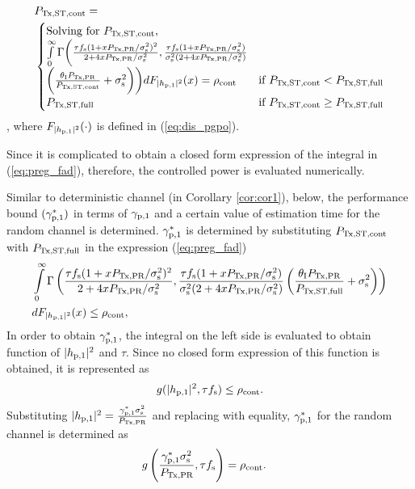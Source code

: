 {\begin{lemma}
\begin{align}
&P_{\text{Tx,ST,cont}} = \nonumber \\ 
& \begin{cases} 
\text{Solving for $P_{\text{Tx,ST,cont}}$, } \\ \int\limits_{0}^{\infty} \Gamma\bigg(\frac{\tau f_{\text{s}} (1 + x P_{\text{Tx,PR}}/\sigma^2_{\text{s}})^2}{2 + 4 x P_{\text{Tx,PR}}/\sigma^2_{\text{s}}}, \frac{\tau f_{\text{s}} (1 + x P_{\text{Tx,PR}}/\sigma^2_{\text{s}})}{\sigma^2_{\text{s}} (2 + 4 x P_{\text{Tx,PR}}/\sigma^2_{\text{s}})} \\ \bigg(\frac{\theta_{\text{I}}P_{\text{Tx,PR}}}{P_{\text{Tx,ST,cont}}}  +  \sigma^2_{\text{s}} \bigg)\bigg) d F_{|h_{\text{p,1}}|^2}(x) = \rho_{\text{cont}} & \mbox{if } P_{\text{Tx,ST,cont}} < P_{\text{Tx,ST,full}} \\
P_{\text{Tx,ST,full}} & \mbox{if } P_{\text{Tx,ST,cont}} \ge P_{\text{Tx,ST,full}}
\end{cases}
\label{eq:preg_fad} 
\end{align}
, where %
$F_{|h_{\text{p,1}}|^2}(\cdot)$ is defined in (\ref{eq:dis_pgpo}). 
\end{lemma} 
\begin{IEEEproof}
Since it is complicated to obtain a closed form expression of the integral in (\ref{eq:preg_fad}), therefore, the controlled power is evaluated numerically.  
\end{IEEEproof}
Similar to deterministic channel (in Corollary \ref{cor:cor1}), below, the performance bound $({\gamma}_{\text{p,1}}^*)$ in terms of ${\gamma}_{\text{p,1}}$ and a certain value of estimation time for the random channel is determined.
 ${\gamma}_{\text{p,1}}^*$ is determined by substituting $P_{\text{Tx,ST,cont}}$ with $P_{\text{Tx,ST,full}}$ in the expression (\ref{eq:preg_fad}) 
\begin{align}
&\int\limits_{0}^{\infty} \Gamma\left( \frac{\tau f_{\text{s}} (1 + x P_{\text{Tx,PR}}/\sigma^2_{\text{s}})^2}{2 + 4 x P_{\text{Tx,PR}}/\sigma^2_{\text{s}}}, \frac{\tau f_{\text{s}} (1 + x P_{\text{Tx,PR}}/\sigma^2_{\text{s}})}{\sigma^2_{\text{s}} (2 + 4 x P_{\text{Tx,PR}}/\sigma^2_{\text{s}})}  \left(\frac{\theta_{\text{I}}P_{\text{Tx,PR}}}{P_{\text{Tx,ST,full}}} + \sigma^2_{\text{s}} \right)\right) \nonumber \\ & d F_{|h_{\text{p,1}}|^2}(x) \le \rho_{\text{cont}}, \label{eq:or_fad}
\end{align}
{In order to obtain ${\gamma}_{\text{p,1}}^*$, the integral on the left side is evaluated to obtain function of $|h_{\text{p,1}}|^2$ and $\tau$. Since no closed form expression of this function is obtained, it is represented as}
\begin{align*}
g(|h_{\text{p,1}}|^2, \tau f_{\text{s}}) \le \rho_{\text{cont}}. \nonumber   
\end{align*}
{Substituting $|h_{\text{p,1}}|^2 = \frac{{\gamma}_{\text{p,1}}^* \sigma^2_{\text{s}}}{P_{\text{Tx,PR}}}$ and replacing with equality, ${\gamma}_{\text{p,1}}^*$ for the random channel is determined as} 
\begin{align*}
g\left(\frac{{\gamma}_{\text{p,1}}^* \sigma^2_{\text{s}}}{P_{\text{Tx,PR}}}, \tau f_{\text{s}}\right) &= \rho_{\text{cont}}. \nonumber  
\end{align*}
\begin{figure}[!ht]


\end{figure}}
